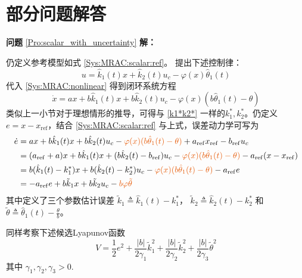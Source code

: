 \chapter{部分问题解答} \label{Problems}

\noindent\textbf{问题} \ref{Pro:scalar_with_uncertainty} \textbf{解：}

仍定义参考模型如式 \eqref{Sys:MRAC:scalar:ref}。
提出下述控制律：
\[ u =  \hat{k}_1 (t) x + \hat{k}_2 (t) u_c - \varphi (x) \hat{\theta}_1 (t) \]
代入 \eqref{Sys:MRAC:nonlinear} 得到闭环系统方程
\begin{equation*}
    \dot{x} = a  x +  b \hat{k}_1 (t) x + b \hat{k}_2 (t) u_c -  \varphi  (x) (b\hat{\theta}_1 (t) - \theta) 
\end{equation*}
类似上一小节对于理想情形的推导，可得与 \eqref{k1*k2*} 一样的$k^{\ast}_1, k^{\ast}_2$。仍定义$e=x-x_{\operatorname{ref}}$，结合 \eqref{Sys:MRAC:scalar:ref} 与上式，误差动力学可写为
\begin{align}
  \dot{e} & =  a  x +  b \hat{k}_1 (t) x + b \hat{k}_2 (t) u_c -\textcolor{second}{  \varphi  (x) (b\hat{\theta}_1 (t) - \theta) }+ a_{\refval}
  x_{\refval} - b_{\refval}
  u_c \nonumber\\
  & = (a_{\refval} + a) x +  b \hat{k}_1 (t) x +
  (b \hat{k}_2 (t) - b_{\refval}) u_c -  \textcolor{second}{\varphi (x)
  (b\hat{\theta}_1 (t) - \theta)} - a_{\refval} (x-x_{\operatorname{ref}})
  \nonumber\\
  & =  b (\hat{k}_1 (t) - k^{\ast}_1) x + b (\hat{k}_2 (t) - k^{\ast}_2)
  u_c -  \textcolor{second}{\varphi (x) (b\hat{\theta}_1 (t) - \theta)} -
  a_{\refval} e \nonumber\\
  & =  - a_{\refval} e + b \tilde{k}_1 x + b
  \tilde{k}_2 u_c - \textcolor{second}{b \varphi \tilde{\theta}} \label{Pro:err:MRAC:nonlinear}
\end{align}
其中定义了三个参数估计误差 $\tilde{k}_1 \triangleq \hat{k}_1 (t) - k^{\ast}_1$， $\tilde{k}_2 \triangleq \hat{k}_2
(t) - k^{\ast}_2$ 和 \textcolor{second}{$\tilde{\theta} \triangleq\hat{\theta}_1 (t) - \frac{\theta}{b}$}。

同样考察下述候选Lyapunov函数
\begin{equation*}
  V = \frac{1}{2} e^2 + \frac{| b |}{2 \gamma_1} \tilde{k}^2_1 + \frac{| b
  |}{2 \gamma_2} \tilde{k}^2_2 + \frac{| b |}{2 \gamma_3} \tilde{\theta}^2 
\end{equation*}
其中 $\gamma_1, \gamma_2, \gamma_3 > 0$.

